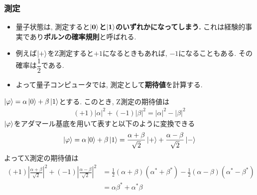 \documentclass[9pt]{beamer}
\begin{document}
\begin{frame}
  \frametitle{測定}
  \begin{itemize}
  \item 量子状態は, 測定すると$\bf{\ket{0}}$\textbf{と}$\bf{\ket{1}}$\textbf{のいずれかになってしまう.} これは経験的事実であり\textbf{ボルンの確率規則}と呼ばれる.
  \item 例えば$\ket{+}$をZ測定すると$+1$になるときもあれば, $-1$になることもある. その確率は$\dfrac{1}{2}$である.
  \item よって量子コンピュータでは, 測定として\textbf{期待値}を計算する.
  \end{itemize}
  $\ket{\varphi} = \alpha \ket{0} + \beta \ket{1}$とする. このとき, Z測定の期待値は
  \begin{align}
    (+1)|\alpha|^2 + (-1)|\beta|^2 = |\alpha|^2 - |\beta|^2
  \end{align}
  $\ket{\varphi}$をアダマール基底を用いて表すと以下のように変換できる
  \begin{align}
    \ket{\varphi} = \alpha \ket{0} + \beta \ket{1} = \frac{\alpha + \beta}{\sqrt{2}} \ket{+} + \frac{\alpha - \beta}{\sqrt{2}} \ket{-}
  \end{align}
  よってX測定の期待値は
  \begin{align}
    (+1)\left| \frac{\alpha + \beta}{\sqrt{2}} \right|^2 + (-1)\left| \frac{\alpha - \beta}{\sqrt{2}} \right|^2 &= \frac{1}{2}(\alpha + \beta)(\alpha^* + \beta^*) - \frac{1}{2}(\alpha - \beta)(\alpha^* - \beta^*)\\
    &= \alpha\beta^* + \alpha^*\beta
  \end{align}
\end{frame}
\end{document}
